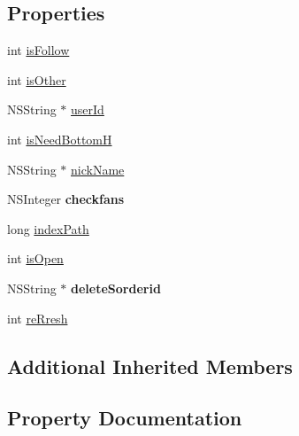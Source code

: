 \subsection*{Properties}
\begin{DoxyCompactItemize}
\item 
int \mbox{\hyperlink{interface_my_share_order_view_controller_a4840c868b5ba55424f2668403de6689d}{is\+Follow}}
\item 
int \mbox{\hyperlink{interface_my_share_order_view_controller_a4da802390d0be8637d80bf11214c0bc3}{is\+Other}}
\item 
N\+S\+String $\ast$ \mbox{\hyperlink{interface_my_share_order_view_controller_adb607159bc35ae956d919c7c39d38330}{user\+Id}}
\item 
int \mbox{\hyperlink{interface_my_share_order_view_controller_ae82983448d44747b61eeafb991458f5f}{is\+Need\+BottomH}}
\item 
N\+S\+String $\ast$ \mbox{\hyperlink{interface_my_share_order_view_controller_aaa609005ae75a7f75eb378fbd3b60b8b}{nick\+Name}}
\item 
\mbox{\label{interface_my_share_order_view_controller_a907fe4d592f974ef5a998edbe7cafa82}} 
N\+S\+Integer {\bfseries checkfans}
\item 
long \mbox{\hyperlink{interface_my_share_order_view_controller_a6464c6a8151b575faca17a13436b02c2}{index\+Path}}
\item 
int \mbox{\hyperlink{interface_my_share_order_view_controller_a2e2a6e240131779d3f869488f6035cec}{is\+Open}}
\item 
\mbox{\label{interface_my_share_order_view_controller_abed6e55628e8be037e12e8a1366757b1}} 
N\+S\+String $\ast$ {\bfseries delete\+Sorderid}
\item 
int \mbox{\hyperlink{interface_my_share_order_view_controller_a0abde30e6c6fdaa0b76794f3bcfd9df0}{re\+Rresh}}
\end{DoxyCompactItemize}
\subsection*{Additional Inherited Members}


\subsection{Property Documentation}
\mbox{\label{interface_my_share_order_view_controller_a6464c6a8151b575faca17a13436b02c2}} 
